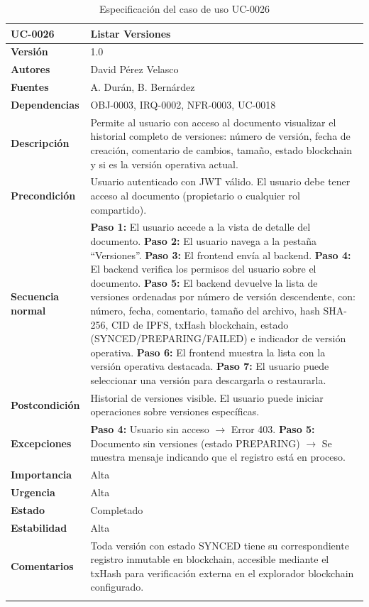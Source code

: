 \documentclass[11pt, a4paper]{article}
\begin{document}
\begin{longtable}{|p{4cm}|p{10cm}|}
\hline
\textbf{UC-0026} & Listar Versiones \\
\hline
\textbf{Versión} & 1.0 \\
\hline
\textbf{Autores} & David Pérez Velasco \\
\hline
\textbf{Fuentes} & A. Durán, B. Bernárdez \\
\hline
\textbf{Dependencias} & OBJ-0003, IRQ-0002, NFR-0003, UC-0018 \\
\hline
\textbf{Descripción} & Permite al usuario con acceso al documento visualizar el historial completo de versiones: número de versión, fecha de creación, comentario de cambios, tamaño, estado blockchain y si es la versión operativa actual. \\
\hline
\textbf{Precondición} & Usuario autenticado con JWT válido. El usuario debe tener acceso al documento (propietario o cualquier rol compartido). \\
\hline
\textbf{Secuencia normal} &
\textbf{Paso 1:} El usuario accede a la vista de detalle del documento.\newline
\textbf{Paso 2:} El usuario navega a la pestaña ``Versiones''.\newline
\textbf{Paso 3:} El frontend envía al backend.\newline
\textbf{Paso 4:} El backend verifica los permisos del usuario sobre el documento.\newline
\textbf{Paso 5:} El backend devuelve la lista de versiones ordenadas por número de versión descendente, con: número, fecha, comentario, tamaño del archivo, hash SHA-256, CID de IPFS, txHash blockchain, estado (SYNCED/PREPARING/FAILED) e indicador de versión operativa.\newline
\textbf{Paso 6:} El frontend muestra la lista con la versión operativa destacada.\newline
\textbf{Paso 7:} El usuario puede seleccionar una versión para descargarla o restaurarla.\\
\hline
\textbf{Postcondición} & Historial de versiones visible. El usuario puede iniciar operaciones sobre versiones específicas. \\
\hline
\textbf{Excepciones} &
\textbf{Paso 4:} Usuario sin acceso $\rightarrow$ Error 403.\newline
\textbf{Paso 5:} Documento sin versiones (estado PREPARING) $\rightarrow$ Se muestra mensaje indicando que el registro está en proceso.\\
\hline
\textbf{Importancia} & Alta \\
\hline
\textbf{Urgencia} & Alta \\
\hline
\textbf{Estado} & Completado \\
\hline
\textbf{Estabilidad} & Alta \\
\hline
\textbf{Comentarios} & Toda versión con estado SYNCED tiene su correspondiente registro inmutable en blockchain, accesible mediante el txHash para verificación externa en el explorador blockchain configurado. \\
\hline
\caption{Especificación del caso de uso UC-0026}
\end{longtable}
\end{document}
